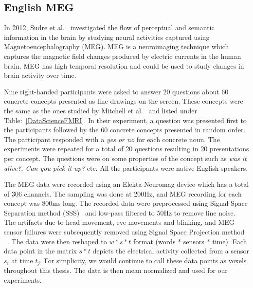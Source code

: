 \subsection{English MEG}

In 2012, Sudre et al.~\cite{SUDRE2012451} investigated the flow of perceptual and semantic information in the brain by studying neural activities captured using Magnetoencephalography (MEG). MEG is a neuroimaging technique which captures the magnetic field changes produced by electric currents in the human brain. MEG has high temporal resolution and could be used to study changes in brain activity over time.

Nine right-handed participants were asked to answer 20 questions about 60 concrete concepts presented as line drawings on the screen. These concepts were the same as the ones studied by Mitchell et al.~\cite{Mitchell1191}  and listed under Table:~\ref{DataScienceFMRI}. In their experiment, a question was presented first to the participants followed by the 60 concrete concepts presented in random order. The participant responded with a \textit{yes or no} for each concrete noun. The experiments were repeated for a total of 20 questions resulting in 20 presentations per concept. The questions were on some properties of the concept such as \textit{was it alive?, Can you pick it up?} etc. All the participants were native English speakers.

The MEG data were recorded using an Elekta Neuromag device which has a total of 306 channels. The sampling was done at 200Hz, and MEG recording for each concept was 800ms long. The recorded data were preprocessed using Signal Space Separation method (SSS)~\cite{SSS} and low-pass filtered to 50Hz to remove line noise. The artifacts due to head movement, eye movements and blinking, and MEG sensor failures were subsequently removed using Signal Space Projection method ~\cite{SSP}. The data were then reshaped to $w*s*t$ format (words * sensors * time). Each data point in the matrix $s*t$ depicts the electrical activity collected from a sensor $s_i$ at time $t_j$. For simplicity, we would continue to call these data points as voxels throughout this thesis. The data is then mean normalized and used for our experiments.

